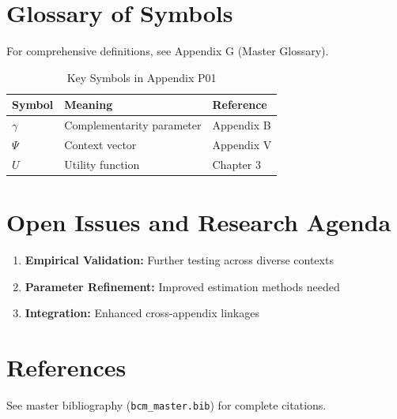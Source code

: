 \section{Glossary of Symbols}
\label{sec:p01-glossary}

For comprehensive definitions, see Appendix G (Master Glossary).

\begin{table}[htbp]
\centering
\caption{Key Symbols in Appendix P01}
\begin{tabular}{lll}
\toprule
\textbf{Symbol} & \textbf{Meaning} & \textbf{Reference} \\
\midrule
$\gamma$ & Complementarity parameter & Appendix B \\
$\Psi$ & Context vector & Appendix V \\
$U$ & Utility function & Chapter 3 \\
\bottomrule
\end{tabular}
\end{table}



\section{Open Issues and Research Agenda}
\label{sec:p01-open}

\begin{enumerate}
    \item \textbf{Empirical Validation:} Further testing across diverse contexts
    \item \textbf{Parameter Refinement:} Improved estimation methods needed
    \item \textbf{Integration:} Enhanced cross-appendix linkages
\end{enumerate}

\section{References}
\label{sec:p01-references}

See master bibliography (\texttt{bcm\_master.bib}) for complete citations.

\nocite{bcm_master}

